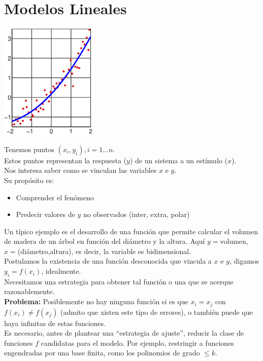\documentclass[10pt]{article}
\theoremstyle{plain}
\theoremstyle{definition}
\begin{document}
\section{Modelos Lineales}
\begin{center}
\includegraphics[scale=0.5]{imagenes/minimosCuadrados.png}
\end{center}
Tenemos puntos $(x_{i}, y_{i}), i = 1\ldots n$.\\
Estos puntos representan la respuesta ($y$) de un sistema a un estímulo ($x$).\\
Nos interesa saber como se vinculan las variables $x$ e $y$.\\
Su propósito es:
\begin{itemize}
\item Comprender el fenómeno
\item Predecir valores de $y$ no observados (inter, extra, polar)
\end{itemize}
Un típico ejemplo es el desarrollo de una función que permite calcular el volumen de madera de un árbol en función del diámetro y la altura. Aquí $y=$volumen, $x=$(diámetro,altura), es decir, la variable es bidimensional.\\

Postulamos la existencia de una función desconocida que vincula a $x$ e $y$, digamos $y_{i}=f(x_{i})$, idealmente.\\

Necesitamos una estrategia para obtener tal función o una que se acerque razonablemente.\\

\textbf{Problema:} Posiblemente no hay ninguna función si es que $x_{i}=x_{j}$ con $f(x_{i})\not = f(x_{j})$ (admito que xisten este tipo de errores), o también puede que haya infinitas de estas funciones.\\

Es necesario, antes de plantear una ``estrategia de ajuste'', reducir la clase de funciones $f$ candidatas para el modelo. Por ejemplo, restringir a funciones engendradas por una base finita, como los polinomios de grado $\le k$.\\
\end{document}

